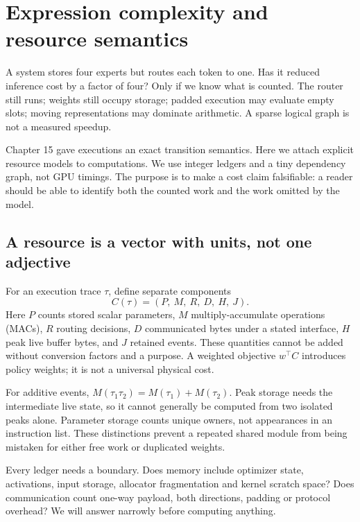 \chapter{Expression complexity and resource semantics}
A system stores four experts but routes each token to one. Has it reduced
inference cost by a factor of four? Only if we know what is counted.
The router still runs; weights still occupy storage; padded execution may
evaluate empty slots; moving representations may dominate arithmetic.
A sparse logical graph is not a measured speedup.

Chapter 15 gave executions an exact transition semantics. Here we attach
explicit resource models to computations. We use integer ledgers and a tiny
dependency graph, not GPU timings. The purpose is to make a cost claim
falsifiable: a reader should be able to identify both the counted work and the
work omitted by the model.

\section{A resource is a vector with units, not one adjective}
For an execution trace $\tau$, define separate components
\begin{equation}
 C(\tau)=(P,\ M,\ R,\ D,\ H,\ J).
\end{equation}
Here $P$ counts stored scalar parameters, $M$ multiply-accumulate operations
(MACs), $R$ routing decisions, $D$ communicated bytes under a stated interface,
$H$ peak live buffer bytes, and $J$ retained events.
These quantities cannot be added without conversion factors and a purpose.
A weighted objective $w^\top C$ introduces policy weights; it is not a universal
physical cost.


For additive events, $M(\tau_1\tau_2)=M(\tau_1)+M(\tau_2)$.
Peak storage needs the intermediate live state, so it cannot generally be
computed from two isolated peaks alone. Parameter storage counts unique owners,
not appearances in an instruction list. These distinctions prevent a repeated
shared module from being mistaken for either free work or duplicated weights.

Every ledger needs a boundary. Does memory include optimizer state, activations,
input storage, allocator fragmentation and kernel scratch space? Does communication
count one-way payload, both directions, padding or protocol overhead?
We will answer narrowly before computing anything.

